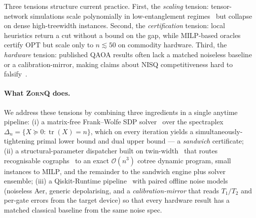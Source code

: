 \documentclass{article}
\theoremstyle{definition}
\theoremstyle{remark}
\newcommand{\ZornQ}{\textsc{ZornQ}\xspace}
\newcommand{\QAOA}{\textsc{QAOA}\xspace}
\newcommand{\SDP}{\textsc{SDP}\xspace}
\newcommand{\MILP}{\textsc{MILP}\xspace}
\newcommand{\OPT}{\mathrm{OPT}}
\newcommand{\Oh}{\mathcal{O}}
\DeclareMathOperator{\tr}{tr}
\begin{document}
Three tensions structure current practice. First, the \emph{scaling}
tension: tensor-network simulations scale polynomially in low-entanglement
regimes~\cite{schollwock2011density,verstraete2004renormalization} but
collapse on dense high-treewidth instances. Second, the \emph{certification}
tension: local heuristics return a cut without a bound on the gap, while
\MILP-based oracles~\cite{huangfu2018parallelizing} certify $\OPT$ but
scale only to $n \lesssim 50$ on commodity hardware. Third, the
\emph{hardware} tension: published \QAOA results often lack a matched
noiseless baseline or a calibration-mirror, making claims about NISQ
competitiveness hard to falsify~\cite{wack2021quality,xue2021effects}.

\paragraph{What \ZornQ does.} We address these tensions by combining
three ingredients in a single anytime pipeline:
(i) a matrix-free Frank--Wolfe \SDP solver~\cite{jaggi2013revisiting,hazan2008sparse}
over the spectraplex $\Delta_n = \{X \succeq 0 : \tr(X) = n\}$, which on
every iteration yields a simultaneously-tightening primal lower bound and
dual upper bound --- a \emph{sandwich} certificate;
(ii) a structural-parameter dispatcher built on
twin-width~\cite{bonnet2022twin} that routes recognisable
cographs~\cite{corneil1981linear} to an exact $\Oh(n^3)$ cotree dynamic
program, small instances to \MILP, and the remainder to the sandwich
engine plus solver ensemble;
(iii) a Qiskit-Runtime pipeline~\cite{qiskit2024,qiskitruntime2024} with
paired offline noise models (noiseless Aer, generic depolarising, and a
\emph{calibration-mirror} that reads $T_1/T_2$ and per-gate errors from
the target device) so that every hardware result has a matched classical
baseline from the same noise spec.
\end{document}
